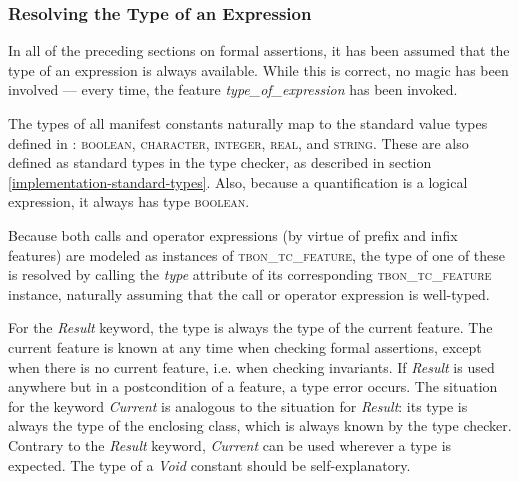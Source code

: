 \subsubsection{Resolving the Type of an Expression}
In all of the preceding sections on formal assertions, it has been assumed that the type of an expression is always available. While this is correct, no magic has been involved --- every time, the feature \textit{type\_of\_expression} has been invoked.

The types of all manifest constants naturally map to the standard value types defined in \bon{} \cite[p.~51]{walden1995}: \textsc{boolean}, \textsc{character}, \textsc{integer}, \textsc{real}, and \textsc{string}. These are also defined as standard types in the type checker, as described in section \ref{implementation-standard-types}. Also, because a quantification is a logical expression, it always has type \textsc{boolean}.

Because both calls and operator expressions (by virtue of prefix and infix features) are modeled as instances of \textsc{tbon\_tc\_feature}, the type of one of these is resolved by calling the \textit{type} attribute of its corresponding \textsc{tbon\_tc\_feature} instance, naturally assuming that the call or operator expression is well-typed.

For the \textit{Result} keyword, the type is always the type of the current feature. The current feature is known at any time when checking formal assertions, except when there is no current feature, i.e. when checking invariants. If \textit{Result} is used anywhere but in a postcondition of a feature, a type error occurs. The situation for the keyword \textit{Current} is analogous to the situation for \textit{Result}: its type is always the type of the enclosing class, which is always known by the type checker. Contrary to the \textit{Result} keyword, \textit{Current} can be used wherever a type is expected. The type of a \textit{Void} constant should be self-explanatory. 
